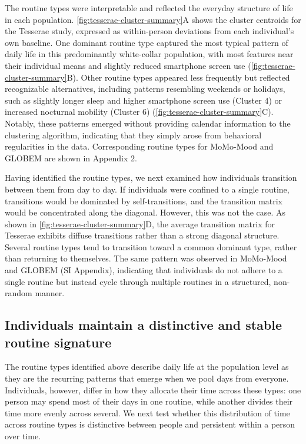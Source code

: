 \documentclass[pdflatex,sn-vancouver,Numbered]{bst/sn-jnl}%
\theoremstyle{thmstyleone}%
\theoremstyle{thmstyletwo}%
\theoremstyle{thmstylethree}%
\begin{document}
The routine types were interpretable and reflected the everyday structure of life in each population. \autoref{fig:tesserae-cluster-summary}A shows the cluster centroids for the Tesserae study, expressed as within-person deviations from each individual's own baseline. One dominant routine type captured the most typical pattern of daily life in this predominantly white-collar population, with most features near their individual means and slightly reduced smartphone screen use (\autoref{fig:tesserae-cluster-summary}B). Other routine types appeared less frequently but reflected recognizable alternatives, including patterns resembling weekends or holidays, such as slightly longer sleep and higher smartphone screen use (Cluster 4) or increased nocturnal mobility (Cluster 6) (\autoref{fig:tesserae-cluster-summary}C). Notably, these patterns emerged without providing calendar information to the clustering algorithm, indicating that they simply arose from behavioral regularities in the data. Corresponding routine types for MoMo-Mood and GLOBEM are shown in Appendix 2.

Having identified the routine types, we next examined how individuals transition between them from day to day. If individuals were confined to a single routine, transitions would be dominated by self-transitions, and the transition matrix would be concentrated along the diagonal. However, this was not the case. As shown in \autoref{fig:tesserae-cluster-summary}D, the average transition matrix for Tesserae exhibits diffuse transitions rather than a strong diagonal structure. Several routine types tend to transition toward a common dominant type, rather than returning to themselves. The same pattern was observed in MoMo-Mood and GLOBEM (SI Appendix), indicating that individuals do not adhere to a single routine but instead cycle through multiple routines in a structured, non-random manner.

\subsection*{Individuals maintain a distinctive and stable routine signature}\label{sec:results:signature_persistence}

The routine types identified above describe daily life at the population level as they are the recurring patterns that emerge when we pool days from everyone. Individuals, however, differ in how they allocate their time across these types: one person may spend most of their days in one routine, while another divides their time more evenly across several. We next test whether this distribution of time across routine types is distinctive between people and persistent within a person over time.
\end{document}
